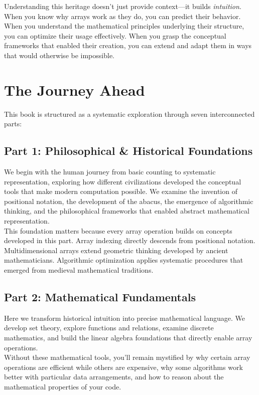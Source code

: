 Understanding this heritage doesn't just provide context—it builds \emph{intuition}. When you know why arrays work as they do, you can predict their behavior. When you understand the mathematical principles underlying their structure, you can optimize their usage effectively. When you grasp the conceptual frameworks that enabled their creation, you can extend and adapt them in ways that would otherwise be impossible.\\

\section*{The Journey Ahead}

This book is structured as a systematic exploration through seven interconnected parts:

\subsection*{Part 1: Philosophical \& Historical Foundations}
We begin with the human journey from basic counting to systematic representation, exploring how different civilizations developed the conceptual tools that make modern computation possible. We examine the invention of positional notation, the development of the abacus, the emergence of algorithmic thinking, and the philosophical frameworks that enabled abstract mathematical representation.\\

This foundation matters because every array operation builds on concepts developed in this part. Array indexing directly descends from positional notation. Multidimensional arrays extend geometric thinking developed by ancient mathematicians. Algorithmic optimization applies systematic procedures that emerged from medieval mathematical traditions.

\subsection*{Part 2: Mathematical Fundamentals}
Here we transform historical intuition into precise mathematical language. We develop set theory, explore functions and relations, examine discrete mathematics, and build the linear algebra foundations that directly enable array operations.\\

Without these mathematical tools, you'll remain mystified by why certain array operations are efficient while others are expensive, why some algorithms work better with particular data arrangements, and how to reason about the mathematical properties of your code.

